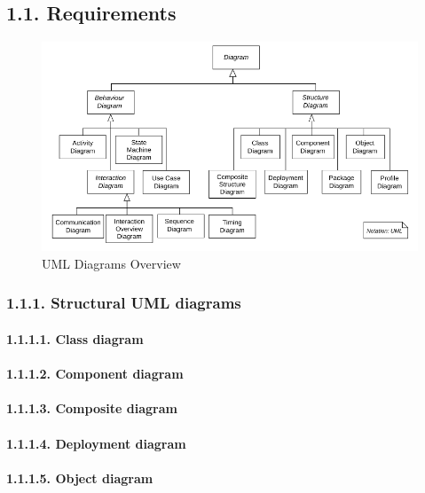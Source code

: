 \documentclass[]{article}
\let\oldparagraph\paragraph
\renewcommand{\paragraph}[1]{\oldparagraph{#1}\mbox{}}
\begin{document}
\subsection{1.1. Requirements}\label{requirements}

\begin{figure}
\centering
\includegraphics{../requirements/uml_diagrams_overview.png}
\caption{UML Diagrams Overview}
\end{figure}

\subsubsection{1.1.1. Structural UML
diagrams}\label{structural-uml-diagrams}

\paragraph{1.1.1.1. Class diagram}\label{class-diagram}

\paragraph{1.1.1.2. Component diagram}\label{component-diagram}

\paragraph{1.1.1.3. Composite diagram}\label{composite-diagram}

\paragraph{1.1.1.4. Deployment diagram}\label{deployment-diagram}

\paragraph{1.1.1.5. Object diagram}\label{object-diagram}
\end{document}
